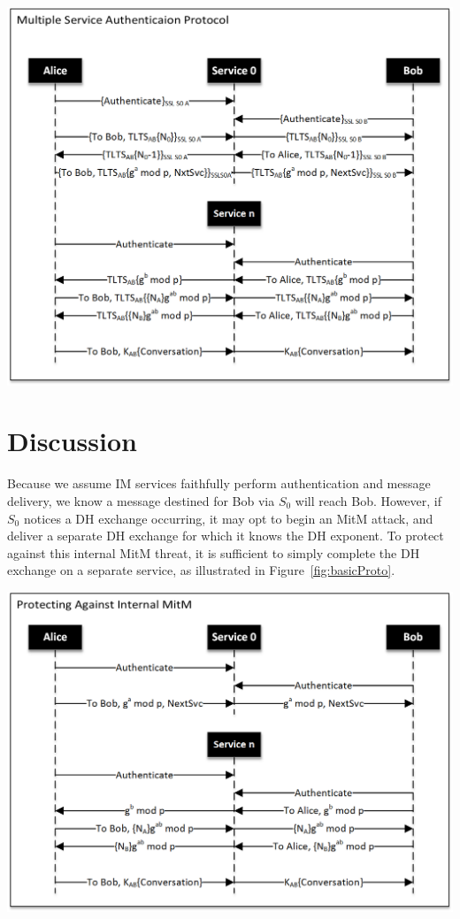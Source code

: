 \documentclass[twoside,10pt]{article}
\newenvironment{Figure}
  {\par\medskip\noindent\minipage{\linewidth}}
  {\endminipage\par\medskip}
\begin{document}
\begin{multicols}{2}
\begin{Figure}
  \centering
  \includegraphics[width=\linewidth]{ProtocolDiagramBW}
  \label{fig:fullProto}
\end{Figure}


\section{Discussion}
Because we assume IM services faithfully perform authentication and message delivery, we know a message destined for Bob via $S_0$ will reach Bob.  However, if $S_0$ notices a DH exchange occurring, it may opt to begin an MitM attack, and deliver a separate DH exchange for which it knows the DH exponent.  To protect against this internal MitM threat, it is sufficient to simply complete the DH exchange on a separate service, as illustrated in Figure~\ref{fig:basicProto}.
\begin{Figure}
  \centering
  \includegraphics[width=\textwidth]{ProtectInternalMitMDiagramBW.png}
  \label{fig:basicProto}
\end{Figure}


\end{multicols}
\end{document}

